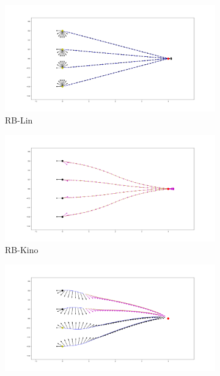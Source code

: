 \begin{figure}[ht]
    \captionsetup[subfigure]{justification=centering}
    \centering
    \begin{subfigure}[t]{0.49\linewidth}
    \includegraphics[width=\textwidth]{Figures/Chapter_CPSB/rotation_lin_180_v04.png}
    \caption{RB-Lin}
    \end{subfigure}
    \begin{subfigure}[t]{0.49\linewidth}
    \includegraphics[width=\textwidth]{Figures/Chapter_CPSB/rotation_kino_180_v04.png}
    \caption{RB-Kino}
    \end{subfigure}
    \begin{subfigure}[t]{0.49\linewidth}
    \includegraphics[width=\textwidth]{Figures/Chapter_CPSB/rotation_p1_180_v04.png}

\end{subfigure}
\end{figure}
